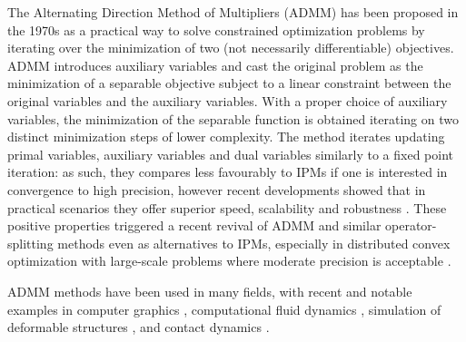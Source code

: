 \documentclass[AMA,STIX1COL]{WileyNJD-v2}
\begin{document}
The Alternating Direction Method of Multipliers (ADMM) has been proposed in the 1970s 
\cite{Glowinski75} %
\cite{Gabay1976} %
as a practical way to solve constrained optimization problems by iterating over the minimization of two (not necessarily differentiable) objectives.
ADMM introduces auxiliary variables and cast the original problem as the minimization of a separable objective subject to a linear constraint between the original variables and the auxiliary variables. With a proper choice of auxiliary variables, the minimization of the separable function is obtained iterating on two distinct minimization steps of lower complexity. The method iterates updating primal variables, auxiliary variables and dual variables similarly to a fixed point iteration: as such, they compares less favourably to IPMs if one is interested in convergence to high precision, however recent developments showed that in practical scenarios they offer superior speed, scalability and robustness
 \cite{Boyd2011}. %
These positive properties triggered a recent revival of ADMM and similar operator-splitting methods even as alternatives to IPMs, especially in distributed convex optimization with large-scale problems where moderate precision is acceptable
\cite{Cannon2019}. %

ADMM methods have been used in many fields, with recent and notable examples in computer graphics 
 \cite{Zhang2019},
computational fluid dynamics
 \cite{Gregson2014}, %
simulation of deformable structures 
 \cite{Overby2017}, %
and contact dynamics 
 \cite{Daviet2020,LeLidec2020}. %
\end{document}
